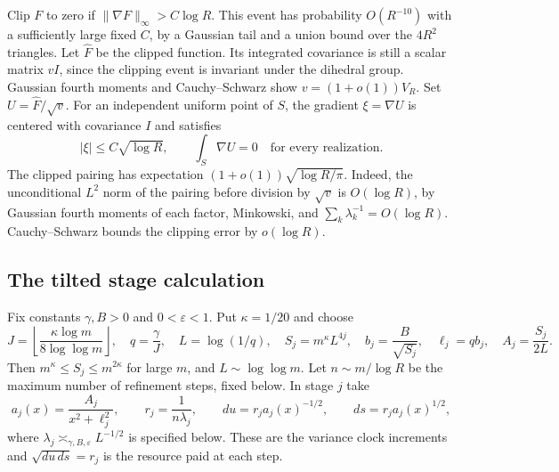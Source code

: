 \documentclass[11pt]{article}
\newcommand{\1}{\mathbf{1}}
\numberwithin{equation}{section}
\begin{document}
Clip \(F\) to zero if \(\|\nabla F\|_\infty>C\log R\). This
event has probability \(O(R^{-10})\) with a sufficiently large
fixed \(C\), by a Gaussian tail and a union bound over the
\(4R^2\) triangles. Let \(\widehat F\) be the clipped function.
Its integrated covariance is still a scalar matrix \(v I\),
since the clipping event is invariant under the dihedral
group. Gaussian fourth moments and Cauchy--Schwarz show
\(v=(1+o(1))V_R\). Set \(U=\widehat F/\sqrt v\).
For an independent uniform point of \(S\), the gradient
\(\xi=\nabla U\) is centered with covariance \(I\) and satisfies
\begin{equation}\label{eq:lower-innovation}
 |\xi|\le C\sqrt{\log R},\qquad
 \int_S\nabla U=0\quad\text{for every realization}.
\end{equation}
The clipped pairing has expectation
\((1+o(1))\sqrt{\log R/\pi}\). Indeed, the unconditional \(L^2\)
norm of the pairing before division by \(\sqrt v\) is
\(O(\log R)\), by Gaussian fourth moments of each factor,
Minkowski, and \(\sum_k\lambda_k^{-1}=O(\log R)\).
Cauchy--Schwarz bounds the clipping error by \(o(\log R)\).

\subsection{The tilted stage calculation}

Fix constants \(\gamma,B>0\) and \(0<\varepsilon<1\).
Put \(\kappa=1/20\) and choose
\[
 J=\left\lfloor\frac{\kappa\log m}{8\log\log m}\right\rfloor,\quad
 q=\frac{\gamma}{J},\quad L=\log(1/q),\quad
 S_j=m^\kappa L^{4j},\quad
 b_j=\frac{B}{\sqrt{S_j}},\quad \ell_j=qb_j,\quad A_j=\frac{S_j}{2L}.
\]
Then \(m^\kappa\le S_j\le m^{2\kappa}\) for large \(m\), and
\(L\sim\log\log m\). Let \(n\sim m/\log R\) be the maximum
number of refinement steps, fixed below. In stage \(j\) take
\begin{equation}\label{eq:lower-stage-clock}
 a_j(x)=\frac{A_j}{x^2+\ell_j^2},\qquad
 r_j=\frac1{n\lambda_j},\qquad
 du=r_j a_j(x)^{-1/2},\qquad ds=r_j a_j(x)^{1/2},
\end{equation}
where \(\lambda_j\asymp_{\gamma,B,\varepsilon}L^{-1/2}\) is
specified below. These are the variance clock increments and
\(\sqrt{du\,ds}=r_j\) is the resource paid at each step.
\end{document}
